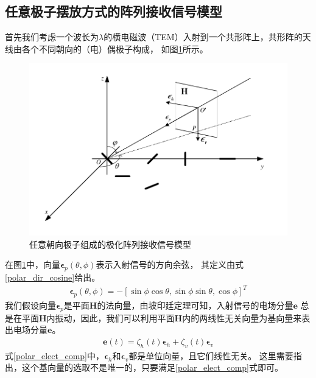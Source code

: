 \documentclass[master]{thesis-uestc}
\begin{document}
\subsection{任意极子摆放方式的阵列接收信号模型}
首先我们考虑一个波长为$\lambda$的横电磁波（TEM）入射到一个共形阵上，共形阵的天线由各个不同朝向的（电）偶极子构成，
如图\ref{polarized_array}所示。
\begin{figure}[h]
    \includegraphics[scale=0.8]{pic/polarized_array.pdf}
    \caption{任意朝向极子组成的极化阵列接收信号模型}
    \label{polarized_array}
\end{figure}
在图\ref{polarized_array}中，向量$\bm{\epsilon}_p(\theta,\phi)$表示入射信号的方向余弦，
其定义由式\eqref{polar_dir_cosine}给出。
\begin{equation}\label{polar_dir_cosine}
    \begin{aligned}
        \bm{\epsilon}_p(\theta,\phi) = 
        -\left[\sin\phi\cos\theta,\sin\phi\sin\theta,\cos\phi\right]^T
    \end{aligned}
\end{equation}
我们假设向量$\bm{\epsilon}_p$是平面$\bm{H}$的法向量，由坡印廷定理可知，入射信号的电场分量$\bm{e}$
总是在平面$\bm{H}$内振动，因此，我们可以利用平面$\bm{H}$内的两线性无关向量为基向量来表出电场分量$\bm{e}$。
\begin{equation}\label{polar_elect_comp}
    \begin{aligned}
        \bm{e}(t) = \zeta_h(t)\bm{\epsilon}_h + \zeta_v(t)\bm{\epsilon}_v
    \end{aligned}
\end{equation}
式\eqref{polar_elect_comp}中，$\bm{\epsilon}_h$和$\bm{\epsilon}_v$都是单位向量，且它们线性无关。
这里需要指出，这个基向量的选取不是唯一的，只要满足\eqref{polar_elect_comp}式即可。
\end{document}
